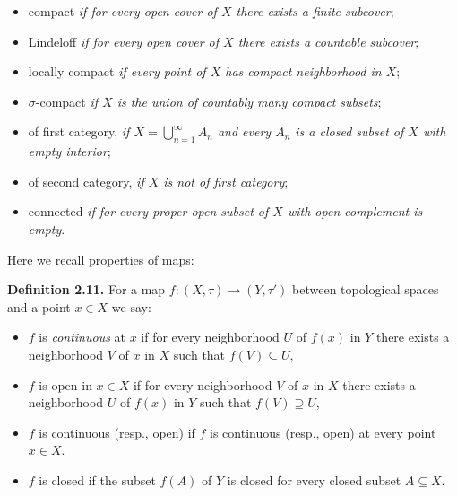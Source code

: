\documentclass[12pt]{article}
\begin{document}
    \begin{itemize}

        \item compact \emph{if for every open cover of $ X $ there exists a finite subcover};
        
        \item Lindeloff \emph{if for every open cover of $ X $ there exists a countable subcover};

        \item locally compact \emph{if every point of $ X $ has compact neighborhood in $ X $};
     
        \item $\sigma$-compact \emph{if $ X $ is the union of countably many compact subsets};
        
        \item of first category, \emph{if $ X = \bigcup^{\infty}_{n=1} A_n $ and every $ A_n $ is a closed subset of $ X $ with empty interior};
        
        \item of second category, \emph{if $ X $ is not of first category};
        
        \item connected \emph{if for every proper open subset of $ X $ with open complement is empty}.

    \end{itemize}


        Here we recall properties of maps:


\textbf{Definition 2.11.} For a map $ f : (X, \tau) \to (Y, \tau') $ between topological spaces and a point $ x \in X $ we say:


        \begin{itemize}

            \item $ f $ is \emph{continuous} at $ x $ if for every neighborhood $ U $ of $ f(x) $ in $ Y $ there exists a neighborhood $ V $ of $ x $ in $ X $
            such that $ f(V) \subseteq U $,
            
            \item $ f $ is open in $ x \in X $ if for every neighborhood $ V $ of $ x $ in $ X $ there exists a neighborhood $ U $ of $ f(x) $ in $ Y $ such
            that $ f(V) \supseteq U $,

            \item $ f $ is continuous (resp., open) if $ f $ is continuous (resp., open) at every point $ x \in X $.
            
            \item $ f $ is closed if the subset $ f(A) $ of $ Y $ is closed for every closed subset $ A \subseteq X $.
            
        \end{itemize}
\end{document}
